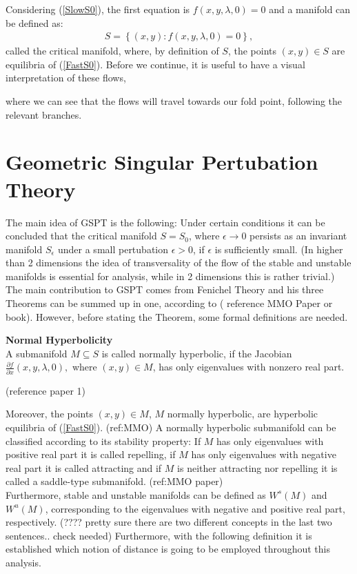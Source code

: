 Considering (\ref{SlowS0}), the first equation is $f(x,y,\lambda, 0)=0$ and a manifold can be defined as:
\begin{align} \label{CriticalS}
S= \left\{ (x,y) : f(x,y,\lambda, 0)=0 \right \},
\end{align}
called the critical manifold, where, by definition of $S$, the points $(x,y) \in S$ are equilibria of (\ref{FastS0}). Before we continue, it is useful to have a visual interpretation of these flows, 
\begin{figure}[h!]\centering
	\label{fig: vdp flow diagram}
\end{figure}
where we can see that the flows will travel towards our fold point, following the relevant branches.


\section{Geometric Singular Pertubation Theory} \label{GSPT}

The main idea of GSPT is the following: Under certain conditions it can be concluded that the critical manifold $S=S_0$, where $\epsilon \to 0$ persists as an invariant manifold $S_{\epsilon}$ under a small pertubation $\epsilon >0$, if $\epsilon$ is sufficiently small. 
(In higher than 2 dimensions the idea of transversality of the flow of the stable and unstable manifolds is essential for analysis, while in 2 dimensions this is rather trivial.)
The main contribution to GSPT comes from Fenichel Theory and his three Theorems can be summed up in one, according to ( reference MMO Paper or book).
However, before stating the Theorem, some formal definitions are needed.

\begin{definition}{\textbf{Normal Hyperbolicity}} \label{NormHyp}
	\\
	A submanifold $M \subseteq S$ is called normally hyperbolic, if the Jacobian $ \frac{\partial f}{\partial x}(x,y, \lambda, 0),$ where $(x,y) \in M$, has only eigenvalues with nonzero real part.
\end{definition} (reference paper 1)

Moreover, the points $(x,y) \in M$, $M$ normally hyperbolic, are hyperbolic equilibria of (\ref{FastS0}). (ref:MMO)
A normally hyperbolic submanifold can be classified according to its stability property: If $M$ has only eigenvalues with positive real part it is called repelling, if $M$ has only eigenvalues with negative real part it is called attracting and if $M$ is neither attracting nor repelling it is called a saddle-type submanifold. (ref:MMO paper) \\
Furthermore, stable and unstable manifolds can be defined as $W^s(M)$  and $W^u(M)$, corresponding to the eigenvalues with negative and positive real part, respectively.
(???? pretty sure there are two different concepts in the last two sentences.. check needed)
Furthermore, with the following definition it is established which notion of distance is going to be employed throughout this analysis.


